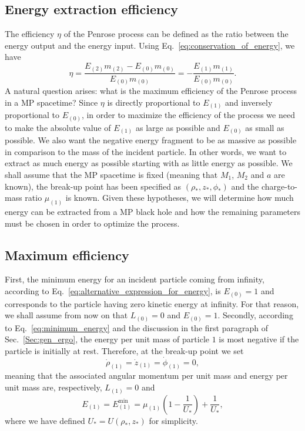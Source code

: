 \subsection{Energy extraction efficiency}

The efficiency $\eta$ of the Penrose process can be defined as the ratio between the energy output and the energy input. Using Eq.~\eqref{eq:conservation_of_energy}, we have
\begin{equation}
    \eta = \frac{E_{(2)}m_{(2)} - E_{(0)}m_{(0)}}{E_{(0)}m_{(0)}} = - \frac{E_{(1)}m_{(1)}}{E_{(0)}m_{(0)}}.
    \label{eq:penrose_efficiency_general}
\end{equation}
%
A natural question arises: what is the maximum efficiency of the Penrose process in a MP spacetime? Since $\eta$ is directly proportional to $E_{(1)}$ and inversely proportional to $E_{(0)}$, in order to maximize the efficiency of the process we need to make the absolute value of $E_{(1)}$ as large as possible and $E_{(0)}$ as small as possible. We also want the negative energy fragment to be as massive as possible in comparison to the mass of the incident particle. In other words, we want to extract as much energy as possible starting with as little energy as possible. We shall assume that the MP spacetime is fixed (meaning that $M_1$, $M_2$ and $a$ are known), the break-up point has been specified as $(\rho_*, z_*, \phi_*)$ and the charge-to-mass ratio $\mu_{(1)}$ is known. Given these hypotheses, we will determine how much energy can be extracted from a MP black hole and how the remaining parameters must be chosen in order to optimize the process.

\subsection{Maximum efficiency}

First, the minimum energy for an incident particle coming from infinity, according to Eq.~\eqref{eq:alternative_expression_for_energy}, is $E_{(0)}=1$ and corresponds to the particle having zero kinetic energy at infinity. For that reason, we shall assume from now on that $L_{(0)}=0$ and $E_{(0)}=1$. Secondly, according to Eq.~\eqref{eq:minimum_energy} and the discussion in the first paragraph of Sec.~\ref{Sec:gen_ergo}, the energy per unit mass of particle $1$ is most negative if the particle is initially at rest. Therefore, at the break-up point we set
\begin{equation} \label{eq:traj1}
    \dot{\rho}_{(1)}=\dot{z}_{(1)}=\dot{\phi}_{(1)}=0,
\end{equation}
meaning that the associated angular momentum per unit mass and energy per unit mass are, respectively, $L_{(1)}=0$ and
\begin{equation} \label{eq:penrose_neg_energy}
    E_{(1)}=E_{(1)}^{\mathrm {min}}=\mu_{(1)}\left(1 - \frac{1}{U_*} \right) + \frac{1}{U_*},
\end{equation}
where we have defined $U_*=U(\rho_*,z_*)$ for simplicity.

